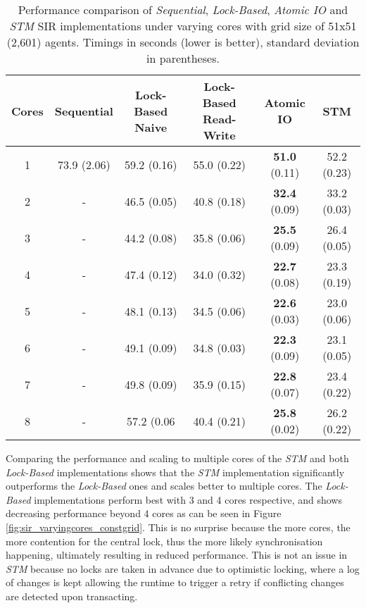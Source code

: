 \begin{table}
	\centering
  	\begin{tabular}{ c || c | c | c | c | c }
        Cores & Sequential  & Lock-Based Naive & Lock-Based Read-Write & Atomic IO             & STM          \\ \hline \hline 
   		1     & 73.9 (2.06) & 59.2 (0.16)      & 55.0 (0.22)           & \textbf{51.0} (0.11)  & 52.2 (0.23)  \\ \hline
   		2     & -           & 46.5 (0.05)      & 40.8 (0.18)           & \textbf{32.4} (0.09)  & 33.2 (0.03)  \\ \hline
   		3     & -           & 44.2 (0.08)      & 35.8 (0.06)           & \textbf{25.5} (0.09)  & 26.4 (0.05)  \\ \hline
   		4     & -           & 47.4 (0.12)      & 34.0 (0.32)           & \textbf{22.7} (0.08)  & 23.3 (0.19)  \\ \hline
   		5     & -           & 48.1 (0.13)      & 34.5 (0.06)           & \textbf{22.6} (0.03)  & 23.0 (0.06)  \\ \hline
   		6     & -           & 49.1 (0.09)      & 34.8 (0.03)           & \textbf{22.3} (0.09)  & 23.1 (0.05)  \\ \hline
   		7     & -           & 49.8 (0.09)      & 35.9 (0.15)           & \textbf{22.8} (0.07)  & 23.4 (0.22)  \\ \hline
   		8     & -           & 57.2 (0.06       & 40.4 (0.21)           & \textbf{25.8} (0.02)  & 26.2 (0.22)  \\ \hline \hline
  	\end{tabular}

  	\caption{Performance comparison of \textit{Sequential}, \textit{Lock-Based}, \textit{Atomic IO} and \textit{STM} SIR implementations under varying cores with grid size of 51x51 (2,601) agents. Timings in seconds (lower is better), standard deviation in parentheses.}
	\label{tab:sir_varyingcores_constgrid}
\end{table}

Comparing the performance and scaling to multiple cores of the \textit{STM} and both \textit{Lock-Based} implementations shows that the \textit{STM} implementation significantly outperforms the \textit{Lock-Based} ones and scales better to multiple cores. The \textit{Lock-Based} implementations perform best with 3 and 4 cores respective, and shows decreasing performance beyond 4 cores as can be seen in Figure \ref{fig:sir_varyingcores_constgrid}. This is no surprise because the more cores, the more contention for the central lock, thus the more likely synchronisation happening, ultimately resulting in reduced performance. This is not an issue in \textit{STM} because no locks are taken in advance due to optimistic locking, where a log of changes is kept allowing the runtime to trigger a retry if conflicting changes are detected upon transacting. 

